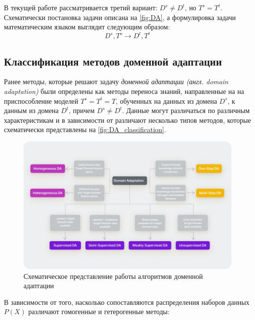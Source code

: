 В текущей работе рассматривается третий вариант: $D^s \ne D^t$, но $T^s = T^t$. Схематически постановка задачи описана на \autoref{fig:DA}, а формулировка задачи математическим языком выглядит следующим образом:
$$D^s, T^s \to D^t, T^t$$

\subsection{Классификация методов доменной адаптации}

Ранее методы, которые решают задачу \textit{доменной адаптации (англ. domain adaptation)}  были определены как методы переноса знаний, направленные на на приспособление моделей $T^s = T^t = T$, обученных на данных из домена $D^s$, к данным из домена $D^t$, причем $D^s \ne D^t$. Данные могут различаться по различным характеристикам и в зависимости от различают несколько типов методов, которые схематически представлены на \autoref{fig:DA_classification}.

\begin{figure}[h]
	\centering
	\includegraphics[width=.85\textwidth]{./images/tasks/DA_classification.jpg}
	\caption{Схематическое представление работы алгоритмов доменной адаптации}
	\label{fig:DA_classification}
\end{figure}

В зависимости от того, насколько сопоставляются распределения наборов данных $P(X)$ различают гомогенные и гетерогенные методы:

